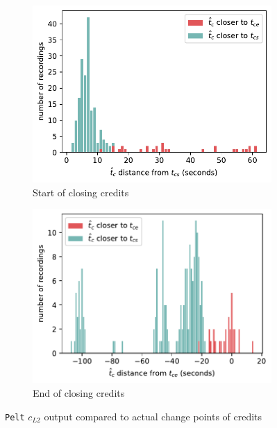 \begin{figure}[H]
\begin{subfigure}[t]{.49\textwidth}
        \centering
        \includegraphics[width=\linewidth]{../plots/distances/pelt_l2_dist_end_first.pdf}
        \caption{Start of closing credits}
        \label{fig:t_diff_cs}
      \end{subfigure}
      \begin{subfigure}[t]{.49\textwidth}
        \centering
        \includegraphics[width=\linewidth]{../plots/distances/pelt_l2_dist_end_last.pdf}
        \caption{End of closing credits}
        \label{fig:t_diff_ce}
      \end{subfigure}
    \caption{\texttt{Pelt} $c_{L2}$ output compared to actual change points of credits}
    \label{fig:t_diff_credits}
\end{figure}


